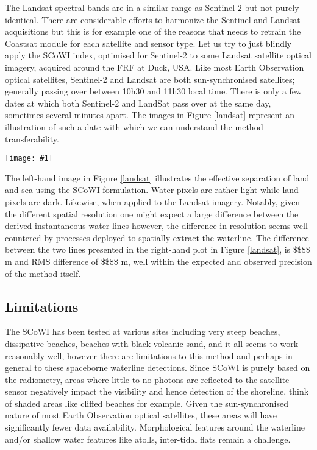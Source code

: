 \documentclass[remotesensing,article,submit,pdftex,moreauthors]{Definitions/mdpi}
\newcommand{\myfigure}[4]{
    \begin{figure*}[ht!]
        \centering
        \texttt{[image: \#1]}	 
        \caption{\itshape#2}
        \label{#3}
    \end{figure*} 
}
\begin{document}
The Landsat spectral bands are in a similar range as Sentinel-2 but not purely identical. There are considerable efforts to harmonize the Sentinel and Landsat acquisitions but this is for example one of the reasons that \citet{VOS2019_google} needs to retrain the Coastsat module for each satellite and sensor type. Let us try to just blindly apply the SCoWI index, optimised for Sentinel-2 to some Landsat satellite optical imagery, acquired around the FRF at Duck, USA. Like most Earth Observation optical satellites, Sentinel-2 and Landsat are both sun-synchronised satellites; generally passing over between 10h30 and 11h30 local time. There is only a few dates at which both Sentinel-2 and LandSat pass over at the same day, sometimes several minutes apart. The images in Figure \ref{landsat} represent an illustration of such a date with which we can understand the method transferability.

\myfigure{img/duck_comparison.png}{SCoWI applied to Sentinel-2 and LandSat satellite optical imagery. The left-hand image shows the SCoWI applied to a Sentinel-2 image and the middle image to Landsat-8 image. The greyscale limits are set between 2\% to 98\% of all pixel values for both images. The coloured lines represent the detected instantaneous water line, which are then both superimposed onto a Sentinel-2 image on the right-hand side.}{landsat}{1}

The left-hand image in Figure \ref{landsat} illustrates the effective separation of land and sea using the SCoWI formulation. Water pixels are rather light while land-pixels are dark. Likewise, when applied to the Landsat imagery. Notably, given the different spatial resolution one might expect a large difference between the derived instantaneous water lines however, the difference in resolution seems well countered by processes deployed to spatially extract the waterline. The difference between the two lines presented in the right-hand plot in Figure \ref{landsat}, is \$\$\$\$ m and RMS difference of \$\$\$\$ m, well within the expected and observed precision of the method itself.  

\subsection{Limitations}
The SCoWI has been tested at various sites including very steep beaches, dissipative beaches, beaches with black volcanic sand, and it all seems to work reasonably well, however there are limitations to this method and perhaps in general to these spaceborne waterline detections. Since SCoWI is purely based on the radiometry, areas where little to no photons are reflected to the satellite sensor negatively impact the visibility and hence detection of the shoreline, think of shaded areas like cliffed beaches for example. Given the sun-synchronised nature of most Earth Observation optical satellites, these areas will have significantly fewer data availability. Morphological features around the waterline and/or shallow water features like atolls, inter-tidal flats remain a challenge. 
\end{document}
